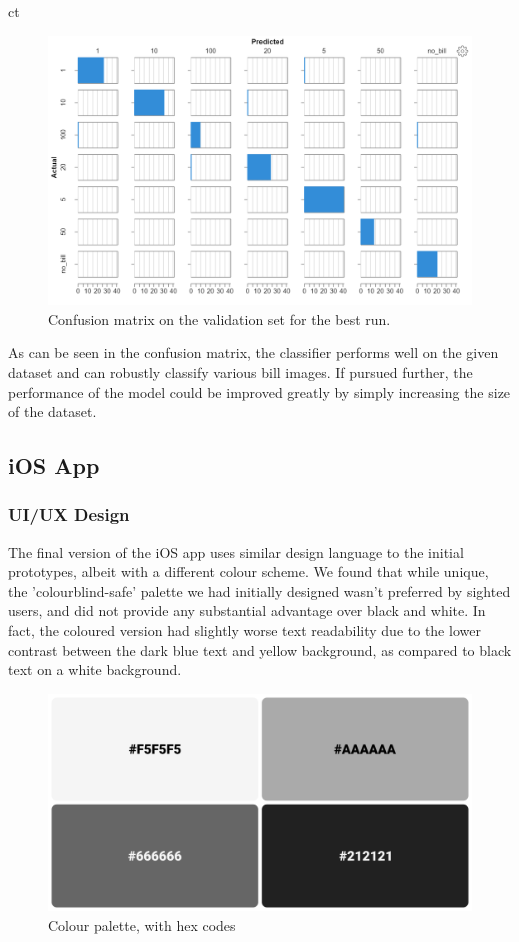 ct\documentclass[a4paper,11pt]{article}
\begin{document}
\begin{figure}[H]
\centering
\includegraphics[scale=0.8]{img/cv/money/conf_matrix.png}
\caption{Confusion matrix on the validation set for the best run.}
\label{fig:conf_matrix}
\end{figure}

As can be seen in the confusion matrix, the classifier performs well on the given dataset and can robustly classify various bill images. If pursued further, the performance of the model could be improved greatly by simply increasing the size of the dataset.

\subsection{iOS App}
\subsubsection{UI/UX Design}
The final version of the iOS app uses similar design language to the initial prototypes, albeit with a different colour scheme. We found that while unique, the 'colourblind-safe' palette we had initially designed wasn't preferred by sighted users, and did not provide any substantial advantage over black and white. In fact, the coloured version had slightly worse text readability due to the lower contrast between the dark blue text and yellow background, as compared to black text on a white background.

\begin{figure}[H]
\centering
\includegraphics[scale=0.5]{img/app/mono_swatch.png}
\caption{Colour palette, with hex codes}
\label{fig:mono_swatch}
\end{figure}
\end{document}
